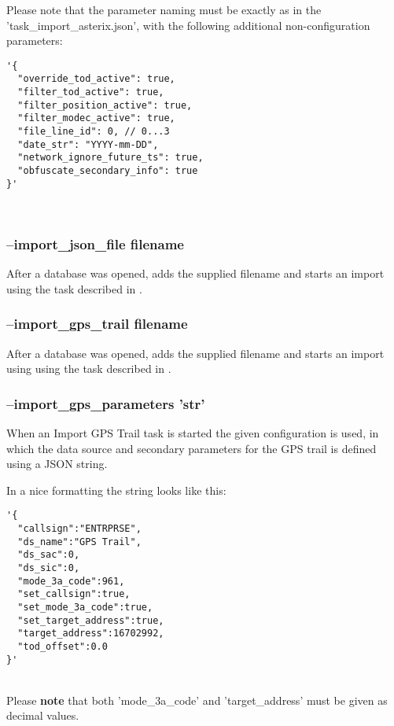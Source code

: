 Please note that the parameter naming must be exactly as in the 'task\_import\_asterix.json', with the following additional non-configuration parameters:
\begin{lstlisting}[basicstyle=\small\ttfamily]
'{
  "override_tod_active": true,
  "filter_tod_active": true,
  "filter_position_active": true,
  "filter_modec_active": true,
  "file_line_id": 0, // 0...3
  "date_str": "YYYY-mm-DD",
  "network_ignore_future_ts": true,
  "obfuscate_secondary_info": true
}'
\end{lstlisting}
\ \\


\subsubsection{--import\_json\_file filename}

After a database was opened, adds the supplied filename and starts an import using the task described in .

\subsubsection{--import\_gps\_trail filename}

After a database was opened, adds the supplied filename and starts an import using using the task described in .

\subsubsection{--import\_gps\_parameters 'str'}

When an Import GPS Trail task is started the given configuration is used, in which the data source and secondary parameters for the GPS trail is defined using a JSON string.

In a nice formatting the string looks like this:
\begin{lstlisting}[basicstyle=\small\ttfamily]
'{
  "callsign":"ENTRPRSE",
  "ds_name":"GPS Trail",
  "ds_sac":0,
  "ds_sic":0,
  "mode_3a_code":961,
  "set_callsign":true,
  "set_mode_3a_code":true,
  "set_target_address":true,
  "target_address":16702992,
  "tod_offset":0.0
}'
\end{lstlisting}
\ \\

Please \textbf{note} that both 'mode\_3a\_code' and 'target\_address' must be given as decimal values.

